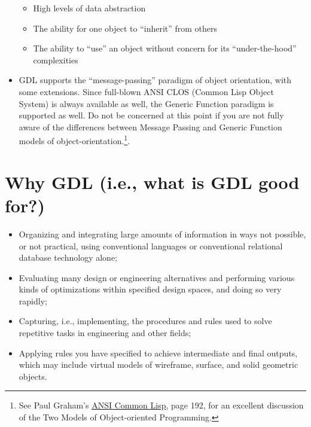 \documentclass [11pt]{book}
\begin{document}
\begin{itemize}
\begin{itemize}
\item High levels of data abstraction

\item The ability for one object to ``inherit'' from others

\item The ability to ``use'' an object without concern for
	its ``under-the-hood'' complexities

\end{itemize}


\item GDL supports the ``message-passing'' paradigm of object
orientation, with some extensions. Since full-blown ANSI CLOS (Common
Lisp Object System) is always available as well, the Generic Function
paradigm is supported as well. Do not be concerned at this point if
you are not fully aware of the differences between Message Passing
and Generic Function models of object-orientation.\footnote{See Paul Graham's 
\underline{ANSI Common Lisp}, page 192, for an excellent discussion of the Two Models 
of Object-oriented Programming.}.

\end{itemize}



\section{Why GDL (i.e., what is GDL good for?)}

\label{sec:whygdl(i.e.,whatisgdlgoodfor?)}



\begin{itemize}

\item Organizing and integrating large amounts of
information in ways not possible, or not practical, using conventional
languages or conventional relational database technology alone;

\item Evaluating many design or engineering alternatives and 
performing various kinds of optimizations within specified design
spaces, and doing so very rapidly;

\item Capturing, i.e., implementing, the procedures and rules used
to solve repetitive tasks in engineering and other fields;

\item Applying rules you have specified to achieve intermediate
and final outputs, which may include virtual models of wireframe,
surface, and solid geometric objects.

\end{itemize}
\end{document}
